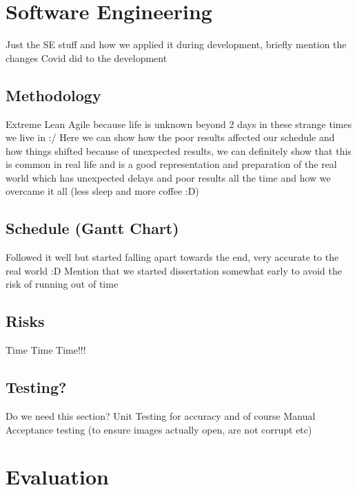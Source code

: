 \documentclass[12pt]{article}
\begin{document}
    \pagebreak


    \section{Software Engineering}

    Just the SE stuff and how we applied it during development, briefly mention the changes Covid did to the development

    \subsection{Methodology}

    Extreme Lean Agile because life is unknown beyond 2 days in these strange times we live in :/
    \linebreak
    Here we can show how the poor results affected our schedule and how things shifted because of unexpected results,
    we can definitely show that this is common in real life and is a good representation and preparation of the real world
    which has unexpected delays and poor results all the time and how we overcame it all (less sleep and more coffee :D)

    \subsection{Schedule (Gantt Chart)}

    Followed it well but started falling apart towards the end, very accurate to the real world :D
    \linebreak
    Mention that we started dissertation somewhat early to avoid the risk of running out of time

    \subsection{Risks}

    Time Time Time!!!

    \subsection{Testing?}

    Do we need this section?
    \linebreak
    Unit Testing for accuracy and of course Manual Acceptance testing (to ensure images actually open, are not corrupt etc)

    \pagebreak


    \section{Evaluation}
\end{document}
